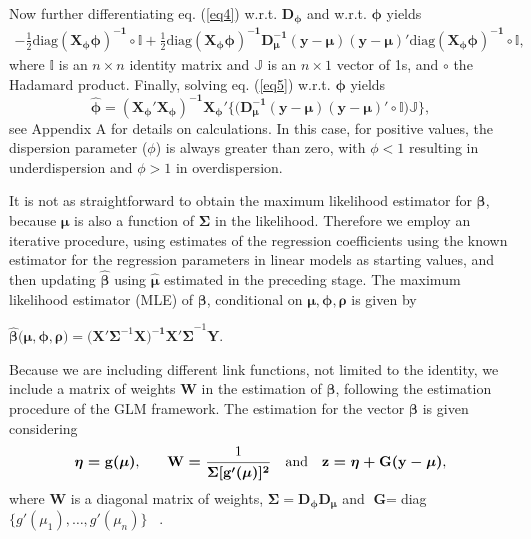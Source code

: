 \documentclass[useAMS,referee]{biom}
\begin{document}
Now further differentiating eq. (\ref{eq4}) w.r.t. $\mathbf{D_\phi}$ and  w.r.t. $\boldsymbol{\phi}$ yields
\begin{equation}\label{eq5}
\begin{array}{l}
-\frac{1}{2}\mbox{diag}\mathbf{ (X_\phi \boldsymbol{\phi})^{-1}}\circ \mathbb{I}+\frac{1}{2}\mbox{diag}\mathbf{ (X_\phi \boldsymbol{\phi})^{-1}D_\mu^{-1}}(\mathbf{y}-\boldsymbol{\mu})(\mathbf{y}-\boldsymbol{\mu})'\mbox{diag}\mathbf{( X_\phi \boldsymbol{\phi})^{-1}}\circ \mathbb{I},
\end{array}
\end{equation}
where $\mathbb{I}$ is an $n \times n$ identity matrix and $\mathbb{J}$ is an $n \times 1$ vector of 1s, and $\circ$ the Hadamard product. Finally, solving eq. (\ref{eq5}) w.r.t. $\boldsymbol{\phi}$ yields
\begin{equation}\label{eq6}
\boldsymbol{\hat{\phi}} = \mathbf{(X_\phi'X_\phi)^{-1}X_\phi'}\mathbf{\{(D_\mu^{-1}}(\mathbf{y}-\boldsymbol{\mu})(\mathbf{y}-\boldsymbol{\mu})'\circ \mathbb{I}) \mathbb{J}\},
\end{equation}
see Appendix A for details on calculations. In this case, for positive values, the dispersion parameter ($\phi$) is always greater than zero, with $\phi < 1$ resulting in underdispersion and $\phi>1$ in overdispersion.

It is not as straightforward to obtain the maximum likelihood estimator for $\boldsymbol{\beta}$, because $\boldsymbol{\mu}$ is also a function of $\boldsymbol{\Sigma}$ in the likelihood. Therefore we employ an iterative procedure, using estimates of the regression coefficients using the known estimator for the regression parameters in linear models as starting values, and then updating $\hat{\boldsymbol{\beta}}$ using $\boldsymbol{\hat{\mu}}$ estimated in the preceding stage. The maximum likelihood estimator (MLE) of $\boldsymbol{\beta}$, conditional on $\boldsymbol{\mu},\boldsymbol{\phi},\boldsymbol{\rho}$ is given by ~\citep{laird1982random,molenberghs2000linear}
\begin{center}
$\boldsymbol{\hat{\beta}(\mu},\boldsymbol{\phi},\boldsymbol{\rho}) =  \mathbf{(X'\boldsymbol{\Sigma}}^{-1}\mathbf{X)^{-1} X'\boldsymbol{\Sigma}}^{-1}\mathbf{Y}$.
\end{center} 


Because we are including different link functions,  not limited to the identity, we include a matrix of weights $\mathbf{W}$ in the estimation of $\boldsymbol{\beta}$, following the estimation procedure of the GLM framework. The estimation for the vector $\boldsymbol{\beta}$ is given considering
\begin{equation}
\boldsymbol{\eta} = \mathbf{g}(\mathbf{\mu})\textnormal{,}  \qquad \mathbf{W} = \dfrac{\textnormal{1}}{\boldsymbol{\Sigma}[\mathbf{g}'(\boldsymbol{\mu})]^2} \quad \mbox{and} \quad \boldmath{\textbf{z} = \eta + \mathbf{G}(\textbf{y} - \mu)}\textnormal{,}
\end{equation}  
where $\textbf{W}$ is a diagonal matrix of weights, $\boldsymbol{\Sigma} = \mathbf{D_\phi D_\mu}$ and $\textbf{G} =$diag$\{g'(\mu_1),\dots,g'(\mu_n)\}$ ~\citep{nelder1972generalized,mccullagh1989generalized}.
\end{document}
